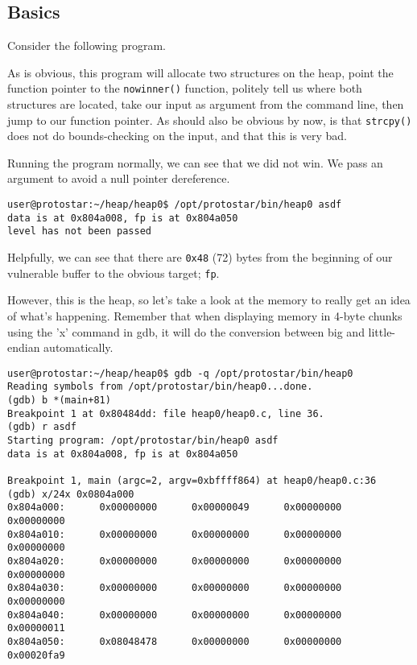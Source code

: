 \subsection{Basics}
Consider the following program.



As is obvious, this program will allocate two structures on the heap,
point the function pointer to the \texttt{nowinner()} function,
politely tell us where both structures are located, take our
input as argument from the command line, then jump to our function pointer.
As should also be obvious by now, is that \texttt{strcpy()} does
not do bounds-checking on the input, and that this is very bad.

Running the program normally, we can see that we did not win.
We pass an argument to avoid a null pointer dereference.
\begin{lstlisting}
user@protostar:~/heap/heap0$ /opt/protostar/bin/heap0 asdf
data is at 0x804a008, fp is at 0x804a050
level has not been passed
\end{lstlisting}
Helpfully, we can see that there are \texttt{0x48} (72) bytes
from the beginning of our vulnerable buffer to the obvious target; \texttt{fp}.

However, this is the heap, so let's take a look at the memory to really get
an idea of what's happening. Remember that when displaying memory in 4-byte
chunks using the 'x' command in gdb, it will do the conversion between
big and little-endian automatically.

\begin{lstlisting}
user@protostar:~/heap/heap0$ gdb -q /opt/protostar/bin/heap0
Reading symbols from /opt/protostar/bin/heap0...done.
(gdb) b *(main+81)
Breakpoint 1 at 0x80484dd: file heap0/heap0.c, line 36.
(gdb) r asdf
Starting program: /opt/protostar/bin/heap0 asdf
data is at 0x804a008, fp is at 0x804a050

Breakpoint 1, main (argc=2, argv=0xbffff864) at heap0/heap0.c:36
(gdb) x/24x 0x0804a000
0x804a000:      0x00000000      0x00000049      0x00000000      0x00000000
0x804a010:      0x00000000      0x00000000      0x00000000      0x00000000
0x804a020:      0x00000000      0x00000000      0x00000000      0x00000000
0x804a030:      0x00000000      0x00000000      0x00000000      0x00000000
0x804a040:      0x00000000      0x00000000      0x00000000      0x00000011
0x804a050:      0x08048478      0x00000000      0x00000000      0x00020fa9
\end{lstlisting}

